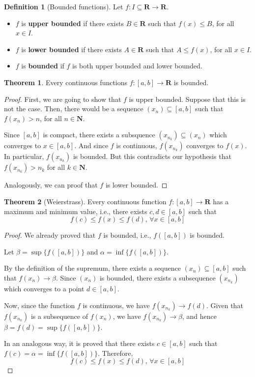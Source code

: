 \documentclass[12pt,a4paper]{article}
\theoremstyle{definition}
\newtheorem{theorem}{Theorem}[section]
\newtheorem{definition}{Definition}[section]
\begin{document}
\begin{definition}[Bounded functions]
	Let $f : I \subseteq \textbf{R} \longrightarrow \textbf{R}$.
	\begin{itemize}
		\item $f$ is \textbf{upper bounded} if there exists $B \in \textbf{R}$ such that $f(x) \leq B$, for all $x \in I$.
		\item $f$ is \textbf{lower bounded} if there exists $A \in \textbf{R}$ such that $A \leq f(x)$, for all $x \in I$.
		\item $f$ is \textbf{bounded} if $f$ is both upper bounded and lower bounded.
	\end{itemize}
\end{definition}

\begin{theorem}
	Every continuous functions $f : [a,b] \longrightarrow \textbf{R}$ is bounded.
\end{theorem}

\begin{proof}
	First, we are going to show that $f$ is upper bounded. Suppose that this is not the case. Then, there would be a sequence $(x_n) \subseteq [a,b]$ such that $f(x_n) > n$, for all $n \in \textbf{N}$.
	
	Since $[a,b]$ is compact, there exists a subsquence $(x_{n_k}) \subseteq (x_n)$ which converges to $x \in [a,b]$. And since $f$ is continuous, $f(x_{n_k})$ converges to $f(x)$. In particular, $f(x_{n_k})$ is bounded. But this contradicts our hypothesis that $f(x_{n_k}) > n_k$ for all $k \in \textbf{N}$.
	
	Analogously, we can proof that $f$ is lower bounded.
\end{proof}

\begin{theorem}[Weierstrass]
	Every continuous function $f : [a,b] \longrightarrow \textbf{R}$ has a maximum and minimum value, i.e., there exists $c, d \in [a,b]$ such that
	\[
		f(c) \leq f(x) \leq f(d) , \, \forall x \in [a,b]
	\]
\end{theorem}

\begin{proof}
	We already proved that $f$ is bounded, i.e., $f([a,b])$ is bounded. 
	
	Let $\beta = \sup \{ f([a,b]) \}$ and $\alpha = \inf \{ f([a,b]) \}$.
	
	By the definition of the supremum, there exists a sequence $(x_n) \subseteq [a,b]$ such that $f(x_n) \longrightarrow \beta$. Since $(x_n)$ is bounded, there exists a subsequence $(x_{n_k})$ which converges to a point $d \in [a,b]$.
	
	Now, since the function $f$ is continuous, we have $f(x_{n_k}) \longrightarrow f(d)$. Given that $f(x_{n_k})$ is a  subsequence of $f(x_n)$, we have $f(x_{n_k}) \longrightarrow \beta$, and hence $\beta = f(d) = \sup \{ f([a,b]) \}$.
	
	In an analogous way, it is proved that there exists $c \in [a,b]$ such that $f(c) = \alpha = \inf \{ f([a,b]) \}$. Therefore,
	\[
		f(c) \leq f(x) \leq f(d) , \, \forall x \in [a,b]
	\]
\end{proof}
\end{document}
